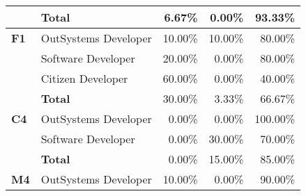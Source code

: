 \begin{table}[tb]
\begin{tabular}{llrrr}
                              & \textbf{Total}       & 6.67\%                                                            & 0.00\%                                                                  & 93.33\%                                                       \\ \hline
    \textbf{F1}               & OutSystems Developer & 10.00\%                                                           & 10.00\%                                                                 & 80.00\%                                                       \\
                              & Software Developer   & 20.00\%                                                           & 0.00\%                                                                  & 80.00\%                                                       \\
                              & Citizen Developer    & 60.00\%                                                           & 0.00\%                                                                  & 40.00\%                                                       \\
                              & \textbf{Total}       & 30.00\%                                                           & 3.33\%                                                                  & 66.67\%                                                       \\ \hline
    \textbf{C4}               & OutSystems Developer & 0.00\%                                                            & 0.00\%                                                                  & 100.00\%                                                      \\
                              & Software Developer   & 0.00\%                                                            & 30.00\%                                                                 & 70.00\%                                                       \\
                              & \textbf{Total}       & 0.00\%                                                            & 15.00\%                                                                 & 85.00\%                                                       \\ \hline
    \textbf{M4}               & OutSystems Developer & 10.00\%                                                           & 0.00\%                                                                  & 90.00\%                                                       \\

\end{tabular}
\end{table}
